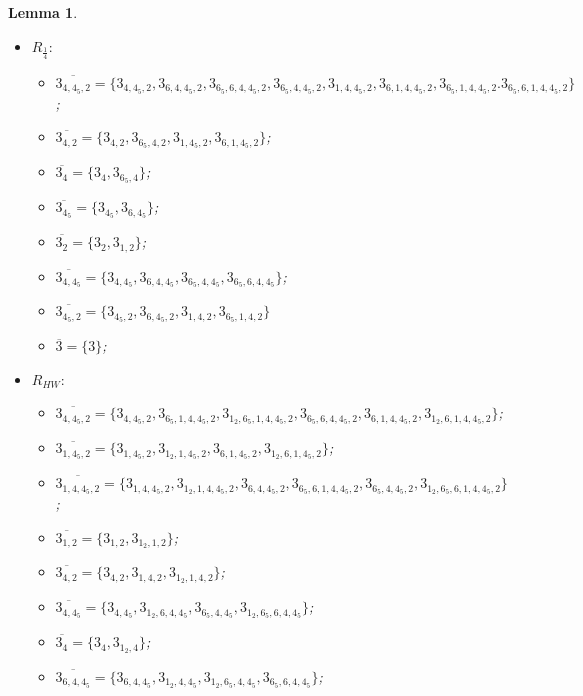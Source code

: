 \documentclass{amsart}
\newtheorem{lemma}{Lemma}[section]
\theoremstyle{definition}
\theoremstyle{remark}
\begin{document}
\begin{lemma}
\begin{itemize}
\begin{itemize}
            \item $\overline{3}=\{3\}$;
        \end{itemize}
        \item $R_{\frac{1}{4}}:$
        \begin{itemize}
            \item $\overline{3_{4,4_5,2}}=\{3_{4,4_5,2},3_{6,4,4_5,2},3_{6_5,6,4,4_5,2},3_{6_5,4,4_5,2},3_{1,4,4_5,2},3_{6,1,4,4_5,2},3_{6_5,1,4,4_5,2}.3_{6_5,6,1,4,4_5,2}\}$;
            \item $\overline{3_{4,2}}=\{3_{4,2},3_{6_5,4,2},3_{1,4_5,2},3_{6,1,4_5,2}\}$;
            \item $\overline{3_4}=\{3_4,3_{6_5,4}\}$;
            \item $\overline{3_{4_5}}=\{3_{4_5},3_{6,4_5}\}$;
            \item $\overline{3_2}=\{3_2,3_{1,2}\}$;
            \item $\overline{3_{4,4_5}}=\{3_{4,4_5},3_{6,4,4_5},3_{6_5,4,4_5},3_{6_5,6,4,4_5}\}$;
            \item $\overline{3_{4_5,2}}=\{3_{4_5,2},3_{6,4_5,2},3_{1,4,2},3_{6_5,1,4,2}\}$
            \item $\overline{3}=\{3\}$;
        \end{itemize}
        \item $R_{HW}:$
        \begin{itemize}
            \item[-] $\overline{3_{4,4_5,2}}=\{3_{4,4_5,2},3_{6_5,1,4,4_5,2},3_{1_2,6_5,1,4,4_5,2},3_{6_5,6,4,4_5,2},3_{6,1,4,4_5,2},3_{1_2,6,1,4,4_5,2}\}$;
            \item[-] $\overline{3_{1,4_5,2}}=\{3_{1,4_5,2},3_{1_2,1,4_5,2},3_{6,1,4_5,2},3_{1_2,6,1,4_5,2}\}$;
            \item[-] $\overline{3_{1,4,4_5,2}}=\{3_{1,4,4_5,2},3_{1_2,1,4,4_5,2},3_{6,4,4_5,2},3_{6_5,6,1,4,4_5,2},3_{6_5,4,4_5,2},3_{1_2,6_5,6,1,4,4_5,2}\}$;
            \item[-] $\overline{3_{1,2}}=\{3_{1,2},3_{1_2,1,2}\}$;
            \item[-] $\overline{3_{4,2}}=\{3_{4,2},3_{1,4,2},3_{1_2,1,4,2}\}$;
            \item[-] $\overline{3_{4,4_5}}=\{3_{4,4_5},3_{1_2,6,4,4_5},3_{6_5,4,4_5},3_{1_2,6_5,6,4,4_5}\}$;
            \item[-] $\overline{3_4}=\{3_4,3_{1_2,4}\}$;
            \item[-] $\overline{3_{6,4,4_5}}=\{3_{6,4,4_5},3_{1_2,4,4_5},3_{1_2,6_5,4,4_5},3_{6_5,6,4,4_5}\}$;

\end{itemize}
\end{itemize}
\end{lemma}
\end{document}

